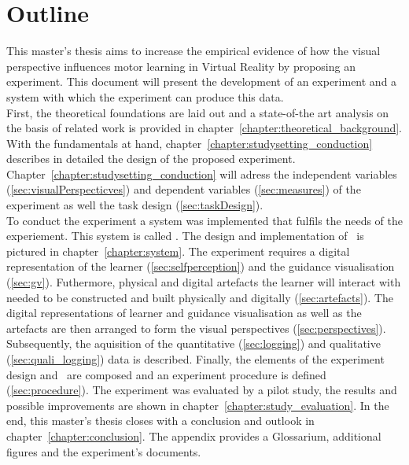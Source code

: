 \section{Outline}
This master's thesis aims to increase the empirical evidence of how the visual perspective influences motor learning in Virtual Reality by proposing an experiment. This document will present the development of an experiment and a system with which the experiment can produce this data.\\
First, the theoretical foundations are laid out and a state-of-the art analysis on the basis of related work is provided in chapter~\ref{chapter:theoretical_background}. With the fundamentals at hand, chapter~\ref{chapter:studysetting_conduction} describes in detailed the design of the proposed experiment. Chapter~\ref{chapter:studysetting_conduction} will adress the independent variables (\ref{sec:visualPerspecticves}) and dependent variables (\ref{sec:measures}) of the experiment as well the task design (\ref{sec:taskDesign}).\\
To conduct the experiment a system was implemented that fulfils the needs of the experiement. This system is called \exgo. The design and implementation of \exgo\ is pictured in chapter~\ref{chapter:system}. The experiment requires a digital representation of the learner (\ref{sec:selfperception}) and the guidance visualisation (\ref{sec:gv}). Futhermore, physical and digital artefacts the learner will interact with needed to be constructed and built physically and digitally (\ref{sec:artefacts}). The digital representations of learner and guidance visualisation as well as the artefacts are then arranged to form the visual perspectives (\ref{sec:perspectives}). Subsequently, the aquisition of the quantitative (\ref{sec:logging}) and qualitative (\ref{sec:quali_logging}) data is described. Finally, the elements of the experiment design and \exgo\ are composed and an experiment procedure is defined (\ref{sec:procedure}). The experiment was evaluated by a pilot study, the results and possible improvements are shown in chapter~\ref{chapter:study_evaluation}. In the end, this master's thesis closes with a conclusion and outlook in chapter~\ref{chapter:conclusion}. The appendix provides a Glossarium, additional figures and the experiment's documents.



